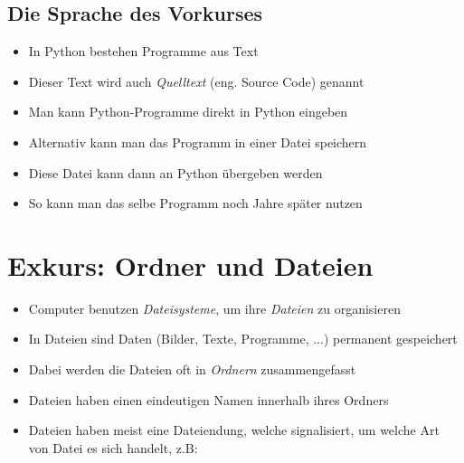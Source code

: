 \subsection{Die Sprache des Vorkurses}
\begin{frame}
    \slidehead
    \begin{itemize}[<+->]
        \item In Python bestehen Programme aus Text
        \item Dieser Text wird auch \emph{Quelltext} (eng. Source Code) genannt
        \item Man kann Python-Programme direkt in Python eingeben
        \item Alternativ kann man das Programm in einer Datei speichern
        \item Diese Datei kann dann an Python übergeben werden
        \item So kann man das selbe Programm noch Jahre später nutzen
    \end{itemize}
\end{frame}

\livecoding

\section{Exkurs: Ordner und Dateien}
\begin{frame}
    \slidehead
    \begin{itemize}[<+->]
        \item Computer benutzen \emph{Dateisysteme}, um ihre \emph{Dateien} zu organisieren
        \item In Dateien sind Daten (Bilder, Texte, Programme, ...) permanent gespeichert
        \item Dabei werden die Dateien oft in \emph{Ordnern} zusammengefasst
        \item Dateien haben einen eindeutigen Namen innerhalb ihres Ordners
        \item Dateien haben meist eine Dateiendung, welche signalisiert, um welche Art von Datei es sich handelt, z.B: 
    \end{itemize}
\end{frame}


